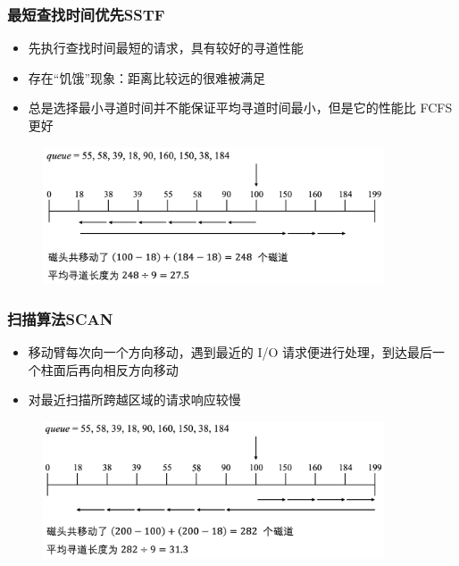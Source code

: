 \documentclass[cs4size,a4paper,10pt]{ctexart}
\begin{document}
	\subsubsection{最短查找时间优先SSTF}
	\begin{itemize}
		\item 先执行查找时间最短的请求，具有较好的寻道性能
		\item 存在“饥饿”现象：距离比较远的很难被满足
		\item 总是选择最小寻道时间并不能保证平均寻道时间最小，但是它的性能比 FCFS 更好
	\end{itemize}
	\begin{figure}[H]
		\centering
		\includegraphics[width=0.9\textwidth]{img/SSTF}
	\end{figure}

	\subsubsection{扫描算法SCAN}
	\begin{itemize}
		\item 移动臂每次向一个方向移动，遇到最近的 I/O 请求便进行处理，到达最后一个柱面后再向相反方向移动
		\item 对最近扫描所跨越区域的请求响应较慢
	\end{itemize}
	\begin{figure}[H]
		\centering
		\includegraphics[width=0.9\textwidth]{img/SCAN}
	\end{figure}
\end{document}
